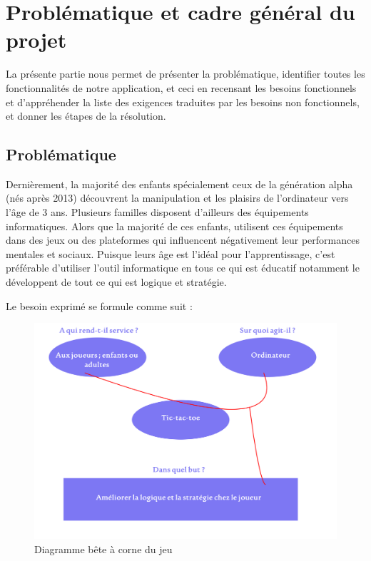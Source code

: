 \chapter{Problématique et cadre général du projet}\label{ch:structure}
La présente partie nous permet de présenter la problématique, identifier toutes les fonctionnalités de notre application, et ceci en recensant les besoins fonctionnels et d’appréhender la liste des exigences traduites par les besoins non fonctionnels, et donner les étapes de la résolution.

\section{Problématique}\label{sec:section1}

Dernièrement, la majorité des enfants spécialement ceux de la génération alpha (nés après 2013)  découvrent la manipulation et les plaisirs de l'ordinateur vers l’âge de  3 ans. Plusieurs familles disposent d'ailleurs des équipements informatiques. Alors que la majorité de ces enfants, utilisent ces équipements dans des jeux ou des plateformes qui influencent négativement leur performances mentales et sociaux. Puisque leurs âge est l’idéal pour l’apprentissage,  c’est préférable d’utiliser l’outil informatique en tous ce qui est éducatif notamment le développent de tout ce qui est logique et stratégie.

Le besoin exprimé se formule comme suit :

\begin{figure}[H]
	\centering
	\includegraphics[width=1\textwidth]{bete a corne.PNG}
	  \caption{Diagramme bête à corne du jeu }
	\label{fig: Diagramme bête à corne du jeu }
\end{figure}
